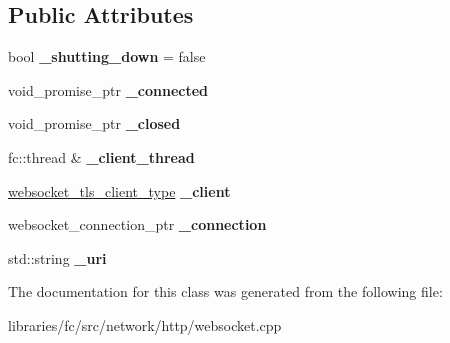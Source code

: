 \subsection*{Public Attributes}
\begin{DoxyCompactItemize}
\item 
\mbox{\label{classfc_1_1http_1_1detail_1_1websocket__tls__client__impl_ae2c0d2e4ffd3d5b64449a8f8d5cc35d0}} 
bool {\bfseries \+\_\+shutting\+\_\+down} = false
\item 
\mbox{\label{classfc_1_1http_1_1detail_1_1websocket__tls__client__impl_ae7815208d5f22fd4494f9cfbd8705bbd}} 
void\+\_\+promise\+\_\+ptr {\bfseries \+\_\+connected}
\item 
\mbox{\label{classfc_1_1http_1_1detail_1_1websocket__tls__client__impl_a4cd42c4020f2d7bd87e3ac9caf2e405d}} 
void\+\_\+promise\+\_\+ptr {\bfseries \+\_\+closed}
\item 
\mbox{\label{classfc_1_1http_1_1detail_1_1websocket__tls__client__impl_a60a3b8de912b561f798d3abe4c752c24}} 
fc\+::thread \& {\bfseries \+\_\+client\+\_\+thread}
\item 
\mbox{\label{classfc_1_1http_1_1detail_1_1websocket__tls__client__impl_a14fc7368d5de4b3f477ab65a1b0ab59b}} 
\mbox{\hyperlink{classwebsocketpp_1_1client}{websocket\+\_\+tls\+\_\+client\+\_\+type}} {\bfseries \+\_\+client}
\item 
\mbox{\label{classfc_1_1http_1_1detail_1_1websocket__tls__client__impl_accd4597b62c76e49820585d387160a74}} 
websocket\+\_\+connection\+\_\+ptr {\bfseries \+\_\+connection}
\item 
\mbox{\label{classfc_1_1http_1_1detail_1_1websocket__tls__client__impl_a94a10ebf9d1d8cda04c6ae4b2e687991}} 
std\+::string {\bfseries \+\_\+uri}
\end{DoxyCompactItemize}


The documentation for this class was generated from the following file\+:\begin{DoxyCompactItemize}
\item 
libraries/fc/src/network/http/websocket.\+cpp\end{DoxyCompactItemize}
